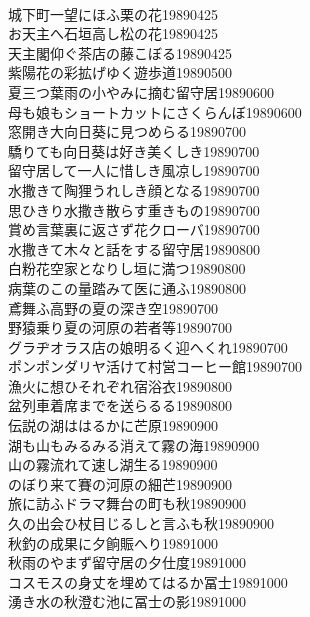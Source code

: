\begin{multicols}{2}
\\城下町一望にほふ栗の花\hfill{19890425}
\\お天主へ石垣高し松の花\hfill{19890425}
\\天主閣仰ぐ茶店の藤こぼる\hfill{19890425}
\\紫陽花の彩拡げゆく遊歩道\hfill{19890500}
\\夏三つ葉雨の小やみに摘む留守居\hfill{19890600}
\\母も娘もショートカットにさくらんぼ\hfill{19890600}
\\窓開き大向日葵に見つめらる\hfill{19890700}
\\驕りても向日葵は好き美くしき\hfill{19890700}
\\留守居して一人に惜しき風凉し\hfill{19890700}
\\水撒きて陶狸うれしき顔となる\hfill{19890700}
\\思ひきり水撒き散らす重きもの\hfill{19890700}
\\賞め言葉裏に返さず花クローバ\hfill{19890700}
\\水撒きて木々と話をする留守居\hfill{19890800}
\\白粉花空家となりし垣に満つ\hfill{19890800}
\\病葉のこの量踏みて医に通ふ\hfill{19890800}
\\鳶舞ふ高野の夏の深き空\hfill{19890700}
\\野猿乗り夏の河原の若者等\hfill{19890700}
\\グラヂオラス店の娘明るく迎へくれ\hfill{19890700}
\\ポンポンダリヤ活けて村営コーヒー館\hfill{19890700}
\\漁火に想ひそれぞれ宿浴衣\hfill{19890800}
\\盆列車着席までを送らるる\hfill{19890800}
\\伝説の湖ははるかに芒原\hfill{19890900}
\\湖も山もみるみる消えて霧の海\hfill{19890900}
\\山の霧流れて速し湖生る\hfill{19890900}
\\のぼり来て賽の河原の細芒\hfill{19890900}
\\旅に訪ふドラマ舞台の町も秋\hfill{19890900}
\\久の出会ひ杖目じるしと言ふも秋\hfill{19890900}
\\秋釣の成果に夕餉賑へり\hfill{19891000}
\\秋雨のやまず留守居の夕仕度\hfill{19891000}
\\コスモスの身丈を埋めてはるか冨士\hfill{19891000}
\\湧き水の秋澄む池に冨士の影\hfill{19891000}

\end{multicols}
